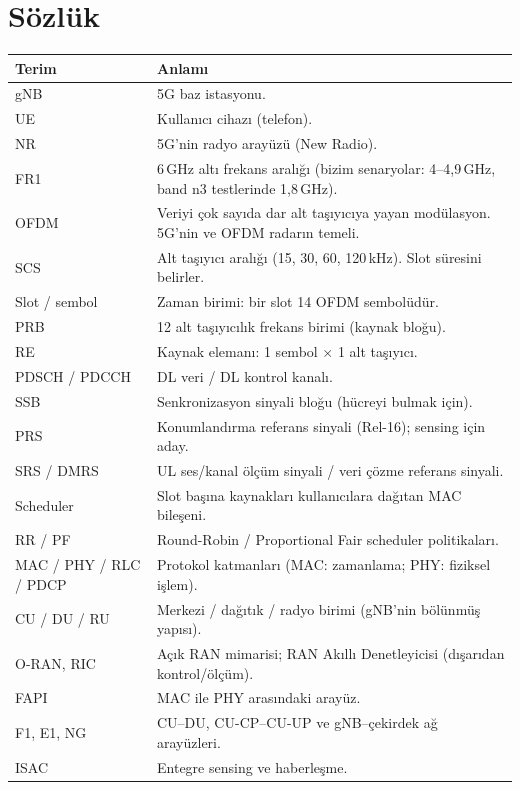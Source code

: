 \appendix
\section{Sözlük}\label{ek:sozluk}

\begingroup\sffamily\small
\begin{xltabular}{\textwidth}{@{}p{3.2cm}X@{}}
\toprule
\textbf{Terim} & \textbf{Anlamı} \\
\midrule
gNB & 5G baz istasyonu. \\
UE & Kullanıcı cihazı (telefon). \\
NR & 5G'nin radyo arayüzü (New Radio). \\
FR1 & 6\,GHz altı frekans aralığı (bizim senaryolar: 4--4,9\,GHz, band n3 testlerinde 1,8\,GHz). \\
OFDM & Veriyi çok sayıda dar alt taşıyıcıya yayan modülasyon. 5G'nin ve OFDM radarın temeli. \\
SCS & Alt taşıyıcı aralığı (15, 30, 60, 120\,kHz). Slot süresini belirler. \\
Slot / sembol & Zaman birimi: bir slot 14 OFDM sembolüdür. \\
PRB & 12 alt taşıyıcılık frekans birimi (kaynak bloğu). \\
RE & Kaynak elemanı: 1 sembol $\times$ 1 alt taşıyıcı. \\
PDSCH / PDCCH & DL veri / DL kontrol kanalı. \\
SSB & Senkronizasyon sinyali bloğu (hücreyi bulmak için). \\
PRS & Konumlandırma referans sinyali (Rel-16); sensing için aday. \\
SRS / DMRS & UL ses/kanal ölçüm sinyali / veri çözme referans sinyali. \\
Scheduler & Slot başına kaynakları kullanıcılara dağıtan MAC bileşeni. \\
RR / PF & Round-Robin / Proportional Fair scheduler politikaları. \\
MAC / PHY / RLC / PDCP & Protokol katmanları (MAC: zamanlama; PHY: fiziksel işlem). \\
CU / DU / RU & Merkezi / dağıtık / radyo birimi (gNB'nin bölünmüş yapısı). \\
O-RAN, RIC & Açık RAN mimarisi; RAN Akıllı Denetleyicisi (dışarıdan kontrol/ölçüm). \\
FAPI & MAC ile PHY arasındaki arayüz. \\
F1, E1, NG & CU--DU, CU-CP--CU-UP ve gNB--çekirdek ağ arayüzleri. \\
ISAC & Entegre sensing ve haberleşme. \\

\end{xltabular}
